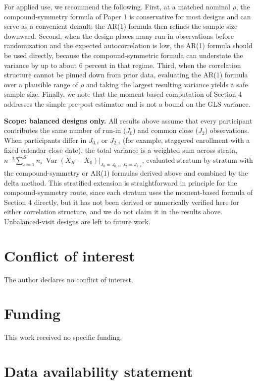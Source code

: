 \documentclass[
  11pt,
]{article}
\begin{document}
For applied use, we recommend the following. First, at a
matched nominal \(\rho\), the compound-symmetry formula of
Paper 1 is conservative for most designs and can serve as
a convenient default; the AR(1) formula then refines the
sample size downward. Second, when the design places many
run-in observations before randomization and the expected
autocorrelation is low, the AR(1) formula should be used
directly, because the compound-symmetric formula can
understate the variance by up to about 6 percent in that
regime. Third, when the correlation structure cannot be
pinned down from prior data, evaluating the AR(1) formula
over a plausible range of \(\rho\) and taking the largest
resulting variance yields a safe sample size. Finally, we
note that the moment-based computation of Section 4
addresses the simple pre-post estimator and is not a
bound on the GLS variance.

\textbf{Scope: balanced designs only.} All results above assume
that every participant contributes the same number of
run-in (\(J_0\)) and common close (\(J_2\)) observations. When
participants differ in \(J_{0,i}\) or \(J_{2,i}\) (for
example, staggered enrollment with a fixed calendar close
date), the total variance is a weighted sum across strata,
\(n^{-2}\sum_{s=1}^{S} n_s\,\mathop{\mathrm{Var}}(X_K-X_0)\vert_{J_0=J_{0,s},\,
J_2=J_{2,s}}\), evaluated stratum-by-stratum with the
compound-symmetry or AR(1) formulas derived above and
combined by the delta method. This stratified extension is
straightforward in principle for the compound-symmetry
route, since each stratum uses the moment-based formula of
Section 4 directly, but it has not been derived or
numerically verified here for either correlation
structure, and we do not claim it in the results above.
Unbalanced-visit designs are left to future work.

\section{Conflict of interest}\label{conflict-of-interest}

The author declares no conflict of interest.

\section{Funding}\label{funding}

This work received no specific funding.

\section{Data availability statement}\label{data-availability-statement}
\end{document}
